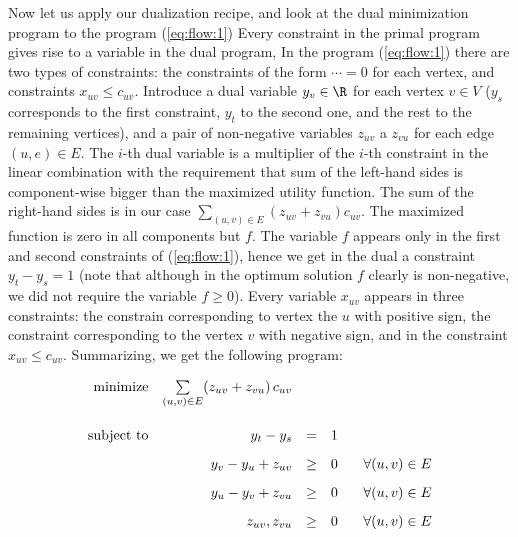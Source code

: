 \noindent
Now let us apply our dualization recipe, and look at the dual minimization program to the program (\ref{eq:flow:1})
Every constraint in the primal program gives rise to a variable in the dual program, In the program  (\ref{eq:flow:1})
there are two types of constraints: the constraints of the form $\cdots = 0$ for each vertex, and
constraints  $x_{uv}\le c_{uv}$. Introduce a dual variable  $y_v\in\R$ for each vertex $v\in V$
($y_s$ corresponds to the first constraint, $y_t$ to the second one, and the rest to the remaining vertices),
and a pair of non-negative variables $z_{uv}$ a $z_{vu}$ for each edge $(u,e)\in E$. The $i$-th dual variable
is a multiplier of the $i$-th constraint in the linear combination with the requirement that sum of the left-hand
sides is component-wise bigger than the maximized utility function. The sum of the right-hand sides is in 
our case $\sum\limits_{(u,v)\in E}(z_{uv}+z_{vu})c_{uv}$.
The maximized function is zero in all components but $f$. The variable $f$ appears only in the first and 
second constraints of  (\ref{eq:flow:1}), hence we get in the dual a constraint $y_t-y_s=1$
(note that although in the optimum solution $f$ clearly is non-negative, we did not require the variable $f\ge0$).
Every variable $x_{uv}$ appears in three constraints: the constrain corresponding to vertex the $u$ with positive sign,
the constraint corresponding to the vertex $v$ with negative sign, and in the constraint $x_{uv}\le c_{uv}$. 
Summarizing, we get the following program:

\begin{equation}
  \label{eq:flow:2}
  \begin{array}{rrcll}
    {\rm minimize}     & \multicolumn{1}{r}{\sum\limits_{(u,v)\in E}(z_{uv}+z_{vu})\,c_{uv}}\\[8mm]
    {\rm subject\ to} & y_t - y_s  &=&1&  \\[3mm]
                            & y_v - y_u + z_{uv} &\ge&0&\;\;\;    \forall (u,v)\in E \\[3mm]
                            & y_u - y_v + z_{vu} &\ge&0&\;\;\;    \forall (u,v)\in E \\[3mm]
                            & z_{uv},z_{vu}&\ge& 0 &  \;\;\;\forall (u,v)\in E\\
  \end{array}
\end{equation}  

